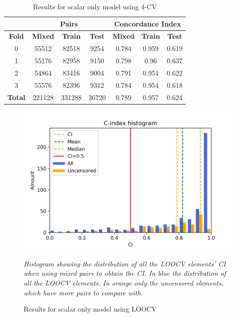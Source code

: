 \begin{table}
  \centering
  \begin{tabular}{|c||c|c|c||c|c|c|}
    \cline{2-7}
    \multicolumn{1}{c|}{} & \multicolumn{3}{|c||}{\textbf{Pairs}} & 
    \multicolumn{3}{c|}{\textbf{Concordance Index}} \\
    \hline
    \textbf{Fold} & \textbf{Mixed} & \textbf{Train} & \textbf{Test} & 
    \textbf{Mixed} & \textbf{Train} & \textbf{Test} \\
    \hhline{=======}
    0 & 55512 & 82518 & 9254 & 0.784 & 0.959 & 0.619 \\
    1 & 55176 & 82958 & 9150 & 0.798 & 0.96 & 0.637 \\
    2 & 54864 & 83416 & 9004 & 0.791 & 0.954 & 0.622 \\
    3 & 55576 & 82396 & 9312 & 0.784 & 0.954 & 0.618 \\
    \hhline{=======}
    \textbf{Total} & 221128 & 331288 & 36720 & 0.789 & 0.957 & 0.624\\
    \hline
  \end{tabular}

  \caption{Results for scalar only model using 4-CV \label{tab:results-scalar-4CV}}
\end{table}

\begin{figure}
  \centering
  \includegraphics[width=.8\textwidth]{images/results/c-index_scalar}
  \caption{Results for scalar only model using \acrshort{LOOCV} \label{fig:results-scalar-LOOCV}}

  \itshape\justify
  Histogram showing the distribution of all the \acrshort{LOOCV} elements' \acrshort{CI}
  when using mixed pairs to obtain the \acrshort{CI}. 
  In blue the distribution of all the \acrshort{LOOCV} elements. In orange only the uncensored
  elements, which have more pairs to compare with.
\end{figure}

